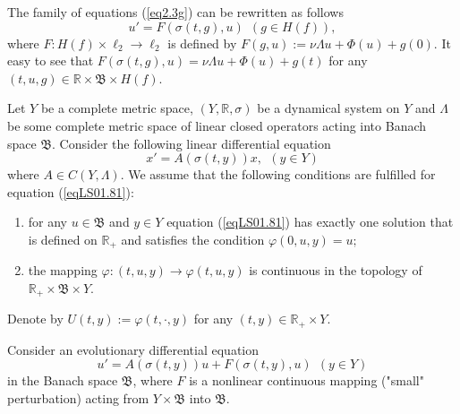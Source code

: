 \documentclass{amsart}%
\newtheorem{lemma}{Lemma}[section]
\begin{document}
The family of equations (\ref{eq2.3g}) can be rewritten as follows
\begin{equation}\label{eq2.3H}
u'=F(\sigma(t,g),u)\ \ (g\in H(f)),
\end{equation}
where $F:H(f)\times \ell_{2}\to \ell_{2}$ is defined by
$F(g,u):=\nu \Lambda u+\Phi (u) +g(0)$. It easy to see that
$F(\sigma(t,g),u)=\nu \Lambda u+\Phi (u)+g(t)$ for any $(t,u,g)\in
\mathbb R\times \mathfrak B \times H(f)$.



Let $Y$ be a complete metric space, $(Y,\mathbb R,\sigma)$ be a
dynamical system on $Y$ and $ \Lambda $ be some complete metric
space of linear closed operators acting into Banach space $
\mathfrak B $. Consider the following linear differential equation
\begin{equation}\label{eqLS01.81}
x'=A(\sigma(t,y))x,\  \ (y\in Y)
\end{equation}
where $A\in C(Y,\Lambda)$. We assume that the following conditions
are fulfilled for equation (\ref{eqLS01.81}):
\begin{enumerate}
\item[a.] for any $ u \in \mathfrak B $ and $y\in Y $ equation
(\ref{eqLS01.81}) has exactly one solution that is defined on $
\mathbb R_{+} $ and satisfies the condition $ \varphi (0,u,y) = u
;$ \item[b.] the mapping $ \varphi : (t,u,y) \to \varphi (t,u,y) $
is continuous in the topology of $ \mathbb R_{+} \times \mathfrak
B \times Y$.
\end{enumerate}

Denote by $U(t,y):=\varphi(t,\cdot,y)$ for any $(t,y)\in \mathbb
R_{+}\times Y$.


Consider an evolutionary differential equation
\begin{equation}\label{eqSL1}
u'=A(\sigma(t,y))u + F(\sigma(t,y),u) \ \ (y\in Y)
\end{equation}
in the Banach space $\mathfrak B$, where $F$ is a nonlinear
continuous mapping ("small" perturbation) acting from $Y\times
\mathfrak B$ into $\mathfrak B$.
\end{document}
